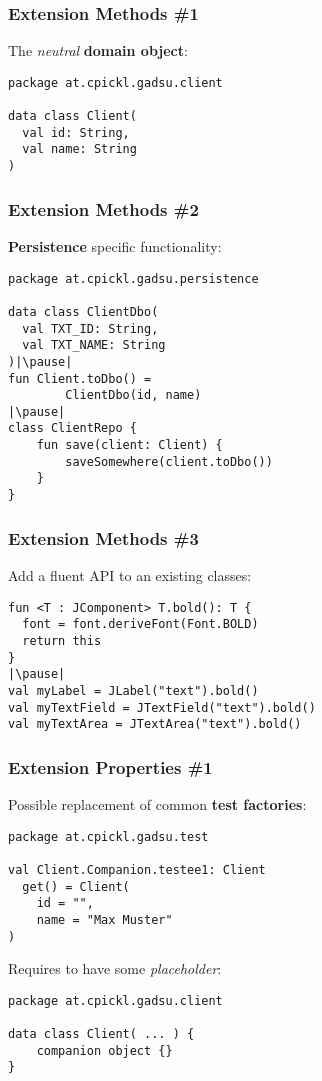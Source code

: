 


\begin{frame}[fragile] \frametitle{Extension Methods \#1}
The \textit{neutral} \textbf{domain object}:
\begin{lstlisting}
package at.cpickl.gadsu.client

data class Client(
  val id: String,
  val name: String
)
\end{lstlisting}
\end{frame}

\begin{frame}[fragile] \frametitle{Extension Methods \#2}
\textbf{Persistence} specific functionality:
\begin{lstlisting}
package at.cpickl.gadsu.persistence

data class ClientDbo(
  val TXT_ID: String,
  val TXT_NAME: String
)|\pause|
fun Client.toDbo() =
        ClientDbo(id, name)
|\pause|
class ClientRepo {
    fun save(client: Client) {
        saveSomewhere(client.toDbo())
    }
}
\end{lstlisting}
\end{frame}


\begin{frame}[fragile] \frametitle{Extension Methods \#3}
Add a fluent API to an existing classes:
\begin{lstlisting}
fun <T : JComponent> T.bold(): T {
  font = font.deriveFont(Font.BOLD)
  return this
}
|\pause|
val myLabel = JLabel("text").bold()
val myTextField = JTextField("text").bold()
val myTextArea = JTextArea("text").bold()
\end{lstlisting}
\end{frame}

\begin{frame}[fragile] \frametitle{Extension Properties \#1}
Possible replacement of common \textbf{test factories}:
\begin{lstlisting}
package at.cpickl.gadsu.test

val Client.Companion.testee1: Client
  get() = Client(
    id = "",
    name = "Max Muster"
)
\end{lstlisting}
\pause

Requires to have some \textit{placeholder}:
\begin{lstlisting}
package at.cpickl.gadsu.client

data class Client( ... ) {
    companion object {}
}
\end{lstlisting}
\end{frame}

